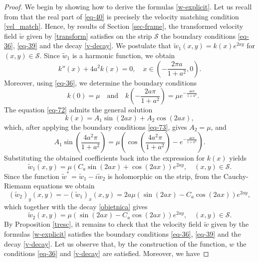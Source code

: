 \documentclass[11pt, letterpaper, reqno]{amsart}
\numberwithin{equation}{section}
\theoremstyle{definition}
\theoremstyle{plain}
\numberwithin{equation}{section}
\def\SS{\mathcal{S}}
\begin{document}
\begin{proof}
We begin by showing how to derive the formulas \eqref{w-explicit}. Let us recall from \cite{CKO} that the real part of \eqref{eq-40} is precisely the velocity matching condition \eqref{vel_match}. Hence, by results of Section \ref{sec-frame}, the transformed velocity field $\tilde w$ given by \eqref{transform} satisfies on the strip $\SS$ the boundary conditions \eqref{eq-36}, \eqref{eq-39} and the decay \eqref{v-decay}. We postulate that $\tilde{w}_{1}(x,y) = k(x)e^{2ay}$ for $(x,y)\in\SS$. Since $\tilde{w}_{1}$ is a harmonic function, we obtain
\begin{equation}\label{eq-72}
k''(x) + 4a^2k(x) = 0, \quad x\in\left(-\frac{2\pi a}{1+a^2}, 0\right).
\end{equation}
Moreover, using \eqref{eq-36}, we determine the boundary conditions
\begin{equation}\label{eq-73}
\quad k(0) = \mu \quad\text{and}\quad k\left(-\frac{2a\pi}{1+a^2}\right) = \mu e^{-\frac{4a\pi}{1+a^2}}.
\end{equation}
The equation \eqref{eq-72} admits the general solution
\begin{equation*}
k(x) = A_{1} \sin(2ax) + A_{2} \cos(2ax),
\end{equation*}
which, after applying the boundary conditions \eqref{eq-73}, gives $A_{2}=\mu$, and
\begin{equation*}
A_{1} \sin\left(\frac{4a^2\pi}{1+a^2}\right) = \mu \left( \cos\left(\frac{4a^2\pi}{1+a^2}\right) - e^{-\frac{4a\pi}{1+a^2}} \right).
\end{equation*}
Substituting the obtained coefficients back into the expression for $k(x)$ yields
\begin{equation*}
\tilde{w}_{1}(x,y) = \mu \left( C_{a}  \sin(2ax) + \cos(2ax) \right)e^{2ay}, \quad (x,y)\in\SS.
\end{equation*}
Since the function $\tilde w^{*} = \tilde{w}_{1} - i\tilde{w}_{2}$ is holomorphic on the strip, from the Cauchy-Riemann equations we obtain
\begin{equation*}
(\tilde{w}_{2})_y(x,y) = -(\tilde{w}_{1})_x(x,y) = 2a\mu\left(\sin(2ax)-C_{a}\cos(2ax)\right)e^{2ay},
\end{equation*}
which together with the decay \eqref{obietnica} gives
\begin{equation*}
\tilde{w}_{2}(x,y) = \mu \left( \sin(2ax) - C_{a} \cos(2ax) \right) e^{2ay}, \quad (x,y)\in\SS.
\end{equation*}
By Proposition \ref{tresc}, it remains to check that the velocity field $\tilde w$ given by the formulas \eqref{w-explicit} satisfies the boundary conditions \eqref{eq-36}, \eqref{eq-39} and the decay \eqref{v-decay}. Let us observe that, by the construction of the function, $w$ the conditions \eqref{eq-36} and \eqref{v-decay} are satisfied. Moreover, we have

\end{proof}
\end{document}
